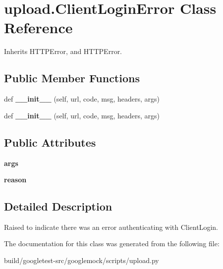 \hypertarget{classupload_1_1ClientLoginError}{}\section{upload.\+Client\+Login\+Error Class Reference}
\label{classupload_1_1ClientLoginError}


Inherits H\+T\+T\+P\+Error, and H\+T\+T\+P\+Error.

\subsection*{Public Member Functions}
\begin{DoxyCompactItemize}
\item 
\mbox{\label{classupload_1_1ClientLoginError_a1e590616c2976d881e155958cedbbe47}} 
def {\bfseries \+\_\+\+\_\+init\+\_\+\+\_\+} (self, url, code, msg, headers, args)
\item 
\mbox{\label{classupload_1_1ClientLoginError_a1e590616c2976d881e155958cedbbe47}} 
def {\bfseries \+\_\+\+\_\+init\+\_\+\+\_\+} (self, url, code, msg, headers, args)
\end{DoxyCompactItemize}
\subsection*{Public Attributes}
\begin{DoxyCompactItemize}
\item 
\mbox{\label{classupload_1_1ClientLoginError_ac300a0b034b2bc64cedc51e09fb6d663}} 
{\bfseries args}
\item 
\mbox{\label{classupload_1_1ClientLoginError_ae0555feb182d89d1e4d7944afbfe14e5}} 
{\bfseries reason}
\end{DoxyCompactItemize}


\subsection{Detailed Description}
\begin{DoxyVerb}Raised to indicate there was an error authenticating with ClientLogin.\end{DoxyVerb}
 

The documentation for this class was generated from the following file\+:\begin{DoxyCompactItemize}
\item 
build/googletest-\/src/googlemock/scripts/upload.\+py\end{DoxyCompactItemize}
